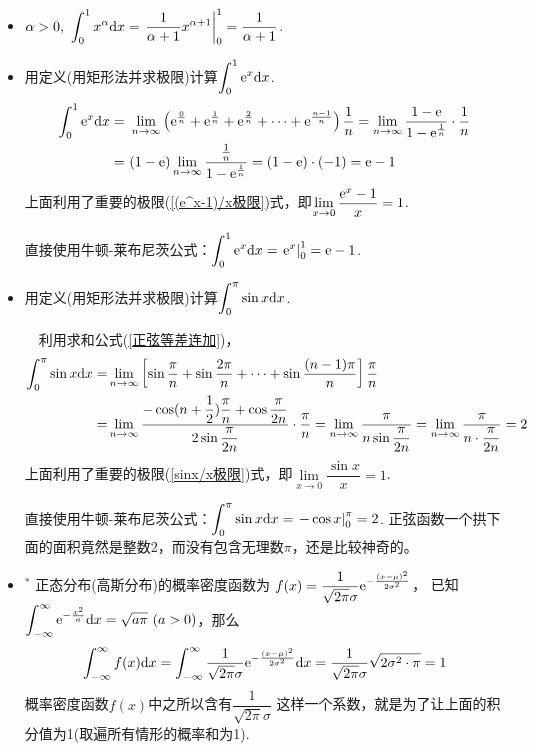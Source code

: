 \begin{itemize}[leftmargin=\inteval{\myitemleftmargin}pt,itemsep=
   \inteval{\myitemitempsep}pt,topsep=\inteval{\myitemtopsep}pt]
直接使用牛顿-莱布尼茨公式：$ \disp \int_{0}^{1}x^2\d x=\left.\dfrac{1}{3}x^3
\right|_0^1=\dfrac{1}{3} $. 

\item $ \disp \alpha>0,\ \int_{0}^{1}x^{\alpha}\d x=\left.\dfrac{1}{\alpha+1}
x^{\alpha+1}\right|_0^1=\dfrac{1}{\alpha+1} $. 

\item 用定义(用矩形法并求极限)计算$ \displaystyle\int_{0}^{1}\mathrm{e}^x\mathrm{d} x $.
\begin{align*}
    \int_{0}^{1}\mathrm{e}^x\mathrm{d} x =&\ \lim_{n\to \infty}\left( \mathrm{e}^{\frac{0}{n}}+\mathrm{e}^{\frac{1}{n}}
    +\mathrm{e}^{\frac{2}{n}}+\cdots +\mathrm{e}^{\frac{n-1}{n}} \right)\dfrac{1}{n} 
    =\lim_{n\to \infty}\dfrac{1-\mathrm{e}}{1-\mathrm{e}^{\frac{1}{n}}}\cdot\dfrac{1}{n} \\ 
    =&\ (1-\mathrm{e})\lim_{n\to \infty}\dfrac{\frac{1}{n}}{1-\mathrm{e}^{\frac{1}{n}}}  
    =(1-\mathrm{e})\cdot (-1) =\mathrm{e}-1
\end{align*}
上面利用了重要的极限(\ref{(e^x-1)/x极限})式，即$ \lim\limits_{x\to 0}\dfrac{\mathrm{e}^x-1}{x}=1 $.

直接使用牛顿-莱布尼茨公式：$ \displaystyle\int_{0}^{1}\mathrm{e}^x\mathrm{d} x=\left. \mathrm{e}^x\right|_0^1=\mathrm{e}-1 $. 

\item 用定义(用矩形法并求极限)计算$ \displaystyle \int_{0}^{\pi}\sin x\mathrm{d} x $. 

\noindent\ \ 利用求和公式(\ref{正弦等差连加})，
\begin{align*}
    \int_{0}^{\pi}\sin x\mathrm{d} x =&\lim_{n\to \infty}\left[\sin\dfrac{\pi}{n}
    +\sin\dfrac{2\pi}{n}+\cdots +\sin \dfrac{(n-1)\pi}{n} \right]\dfrac{\pi}{n} \\
    =&\lim_{n\to \infty} \dfrac{-\cos(n+\dfrac{1}{2})\dfrac{\pi}{n}+\cos  \dfrac{\pi}{2n}}{2\sin \dfrac{\pi}{2n}}\cdot\dfrac{\pi}{n}  
    =\lim_{n\to \infty}\dfrac{\pi}{n\sin \dfrac{\pi}{2n}} 
    =\lim_{n\to \infty}\dfrac{\pi}{n\cdot \dfrac{\pi}{2n}} =2
\end{align*}
上面利用了重要的极限(\ref{sinx/x极限})式，即$ \lim\limits_{x\to 0}\dfrac{\sin x}{x}=1 $.

直接使用牛顿-莱布尼茨公式：$ \displaystyle\int_{0}^{\pi}\sin x\mathrm{d} x=\left.-\cos x\right|_0^{\pi}
=2 $. 正弦函数一个拱下面的面积竟然是整数2，而没有包含无理数$ \pi $，还是比较神奇的。

\item $^*$ 正态分布(高斯分布)的概率密度函数为
$ f(x)=\dfrac{1}{\sqrt{2\pi}\sigma}\mathrm{e}^{-\frac{(x-\mu)^2}{2\sigma^2}} $，
已知$ \disp \int_{-\infty}^{\infty}\e^{-\frac{x^2}{a}}\d x=\sqrt{a\pi}\ (a>0) $，那么
\begin{align*}
    \int_{-\infty}^{\infty}f(x)\mathrm{d} x=\int_{-\infty}^{\infty}
    \dfrac{1}{\sqrt{2\pi}\sigma}\mathrm{e}^{-\frac{(x-\mu)^2}{2\sigma^2}}\mathrm{d} x=\dfrac{1}{\sqrt{2\pi}\sigma}
    \sqrt{2\sigma^2 \cdot \pi}=1
\end{align*}
概率密度函数$ f(x) $中之所以含有$ \dfrac{1}{\sqrt{2\pi}\sigma} $
这样一个系数，就是为了让上面的积分值为1(取遍所有情形的概率和为1). 


\end{itemize}
